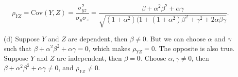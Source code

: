 \begin{itemize}
        \begin{equation*}
            \rho_{YZ} = \mathrm{Cov}(Y, Z)
                = \frac{\sigma_{yz}^2}{\sigma_y \sigma_z}
                = \frac{\beta + \alpha^2 \beta^2 + \alpha \gamma}{\sqrt{(1 + \alpha^2)(1 + (1 + \alpha^2) \beta^2 + \gamma^2 + 2 \alpha \beta \gamma}}.
        \end{equation*}
    \item[(d)] Suppose $Y$ and $Z$ are dependent, then $\beta \neq 0$.
        But we can choose $\alpha$ and $\gamma$ such that $\beta + \alpha^2\beta^2 + \alpha\gamma = 0$, which makes $\rho_{YZ} = 0$.
        The opposite is also true.
        Suppose $Y$ and $Z$ are independent, then $\beta = 0$.
        Choose $\alpha, \gamma \neq 0$, then $\beta + \alpha^2 \beta^2 + \alpha \gamma \neq 0$, and $\rho_{YZ} \neq 0$.
\end{itemize}
